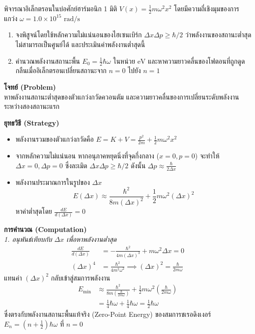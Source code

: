 \begin{psctexample}
พิจารณาอิเล็กตรอนในบ่อศักย์ฮาร์มอนิก 1 มิติ $V(x) = \frac{1}{2} m \omega^2 x^2$ โดยมีความถี่เชิงมุมของการแกว่ง $\omega = 1.0 \times 10^{15}\text{ rad/s}$
\begin{enumerate}
    \item จงพิสูจน์โดยใช้หลักความไม่แน่นอนของไฮเซนเบิร์ก $\Delta x \Delta p \ge \hbar/2$ ว่าพลังงานของสถานะต่ำสุดไม่สามารถเป็นศูนย์ได้ และประเมินค่าพลังงานต่ำสุดนี้
    \item คำนวณพลังงานสถานะพื้น $E_0 = \frac{1}{2}\hbar\omega$ ในหน่วย $\text{eV}$ และหาความยาวคลื่นของโฟตอนที่ถูกดูดกลืนเมื่ออิเล็กตรอนเปลี่ยนสถานะจาก $n=0$ ไปยัง $n=1$
\end{enumerate}

\textbf{โจทย์ (Problem)} \\
หาพลังงานสถานะต่ำสุดของตัวแกว่งกวัดควอนตัม และความยาวคลื่นของการเปลี่ยนระดับพลังงานระหว่างสองสถานะแรก

\textbf{ยุทธวิธี (Strategy)} \\
\begin{itemize}
    \item พลังงานรวมของตัวแกว่งกวัดคือ $E = K + V = \frac{p^2}{2m} + \frac{1}{2}m\omega^2 x^2$
    \item จากหลักความไม่แน่นอน หากอนุภาคหยุดนิ่งที่จุดกึ่งกลาง ($x=0, p=0$) จะทำให้ $\Delta x = 0, \Delta p = 0$ ซึ่งละเมิด $\Delta x \Delta p \ge \hbar/2$ ดังนั้น $\Delta p \approx \frac{\hbar}{2\Delta x}$
    \item พลังงานประมาณการในรูปของ $\Delta x$
    \begin{equation}
    E(\Delta x) \approx \frac{\hbar^2}{8m(\Delta x)^2} + \frac{1}{2}m\omega^2 (\Delta x)^2
    \end{equation}
    หาค่าต่ำสุดโดย $\frac{dE}{d(\Delta x)} = 0$
\end{itemize}

\textbf{การคำนวณ (Computation)} \\
\textit{1. อนุพันธ์เทียบกับ $\Delta x$ เพื่อหาพลังงานต่ำสุด}
\begin{align}
\frac{dE}{d(\Delta x)} &= -\frac{\hbar^2}{4m(\Delta x)^3} + m\omega^2 \Delta x = 0 \nonumber \\
(\Delta x)^4 &= \frac{\hbar^2}{4m^2\omega^2} \implies (\Delta x)^2 = \frac{\hbar}{2m\omega}
\end{align}
แทนค่า $(\Delta x)^2$ กลับเข้าสู่สมการพลังงาน
\begin{align}
E_{\min} &\approx \frac{\hbar^2}{8m\left(\frac{\hbar}{2m\omega}\right)} + \frac{1}{2}m\omega^2 \left(\frac{\hbar}{2m\omega}\right) \nonumber \\
&= \frac{1}{4}\hbar\omega + \frac{1}{4}\hbar\omega = \frac{1}{2}\hbar\omega
\end{align}
ซึ่งตรงกับพลังงานสถานะพื้นแท้จริง (Zero-Point Energy) ของสมการชเรอดิงเงอร์ $E_n = \left(n + \frac{1}{2}\right)\hbar\omega$ ที่ $n=0$


\end{psctexample}
